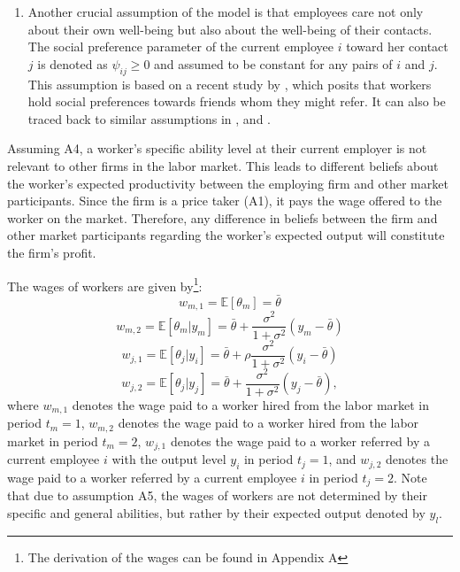 \documentclass[12pt]{article}
\begin{document}
\begin{enumerate}[label={A}{\arabic*}., resume]
    \item Another crucial assumption of the model is that employees care not only about their own well-being but also about the well-being of their contacts. The social preference parameter of the current employee $i$ toward her contact $j$ is denoted as $\psi_{ij} \geq 0$ and assumed to be constant for any pairs of $i$ and $j$. This assumption is based on a recent study by \cite{friebel2023employee}, which posits that workers hold social preferences towards friends whom they might refer. It can also be traced back to similar assumptions in \cite{bandiera2005social}, \cite{bandiera2009social} and \cite{beaman2012gets}.
\end{enumerate}

Assuming A4, a worker's specific ability level at their current employer is not relevant to other firms in the labor market. This leads to different beliefs about the worker's expected productivity between the employing firm and other market participants. Since the firm is a price taker (A1), it pays the wage offered to the worker on the market. Therefore, any difference in beliefs between the firm and other market participants regarding the worker's expected output will constitute the firm's profit.

The wages of workers are given by\footnote{The derivation of the wages can be found in Appendix A}:
\begin{equation}\label{eq_w_m_1}
    w_{m,1} = \mathbb{E}[\theta_{m}] = \bar{\theta}
\end{equation}
\begin{equation}\label{eq_w_m_2}
    w_{m,2} = \mathbb{E}[\theta_{m}|y_{m}] = \bar{\theta} + \frac{\sigma^2}{1+\sigma^2}(y_m - \bar{\theta})
\end{equation}
\begin{equation}\label{eq_w_j_1_y_i}
    w_{j,1} = \mathbb{E}[\theta_{j}|y_{i}] = \bar{\theta}+\rho\frac{\sigma^2}{1+\sigma^2}(y_i-\bar{\theta})
\end{equation}
\begin{equation}\label{eq_w_j_2}
    w_{j,2} = \mathbb{E}[\theta_j|y_j] = \bar{\theta}+\frac{\sigma^2}{1+\sigma^2}(y_j - \bar{\theta}),
\end{equation}
where $w_{m,1}$ denotes the wage paid to a worker hired from the labor market in period $t_m=1$, $w_{m,2}$ denotes the wage paid to a worker hired from the labor market in period $t_m=2$, $w_{j,1}$ denotes the wage paid to a worker referred by a current employee $i$ with the output level $y_i$ in period $t_j=1$, and $w_{j,2}$ denotes the wage paid to a worker referred by a current employee $i$ in period $t_j=2$. Note that due to assumption A5, the wages of workers are not determined by their specific and general abilities, but rather by their expected output denoted by $y_l$. 
\end{document}
